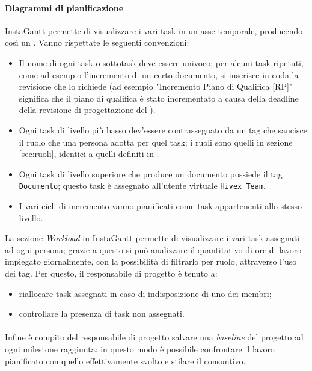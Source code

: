 \paragraph{Diagrammi di pianificazione}
InstaGantt permette di visualizzare i vari task in un asse temporale, producendo così un . 
Vanno rispettate le seguenti convenzioni:
\begin{itemize}
	\item Il nome di ogni task o sottotask deve essere univoco; per alcuni task ripetuti, come ad esempio l'incremento di un certo documento, si inserisce in coda la revisione che lo richiede (ad esempio "Incremento Piano di Qualifica [RP]" significa che il piano di qualifica è stato incrementato a causa della deadline della revisione di progettazione del \TV).
	\item Ogni task di livello più basso dev'essere contrassegnato da un tag che sancisce il ruolo che una persona adotta per quel task; i ruoli sono quelli in sezione \ref{sec:ruoli}, identici a quelli definiti in \PdP.
	\item Ogni task di livello superiore che produce un documento possiede il tag \texttt{Documento}; questo task è assegnato all'utente virtuale \texttt{Hivex Team}.
	\item I vari cicli di incremento vanno pianificati come task appartenenti allo stesso livello.
\end{itemize}
La sezione \emph{Workload} in InstaGantt permette di visualizzare i vari task assegnati ad ogni persona; grazie a questo si può analizzare il quantitativo di ore di lavoro impiegato giornalmente, con la possibilità di filtrarlo per ruolo, attraverso l'uso dei tag. Per questo, il responsabile di progetto è tenuto a:
\begin{itemize}
	\item riallocare task assegnati in caso di indisposizione di uno dei membri;
	\item controllare la presenza di task non assegnati.
\end{itemize}

\paragraph{} Infine è compito del responsabile di progetto salvare una \emph{baseline} del progetto ad ogni milestone raggiunta: in questo modo è possibile confrontare il lavoro pianificato con quello effettivamente svolto e stilare il consuntivo.

